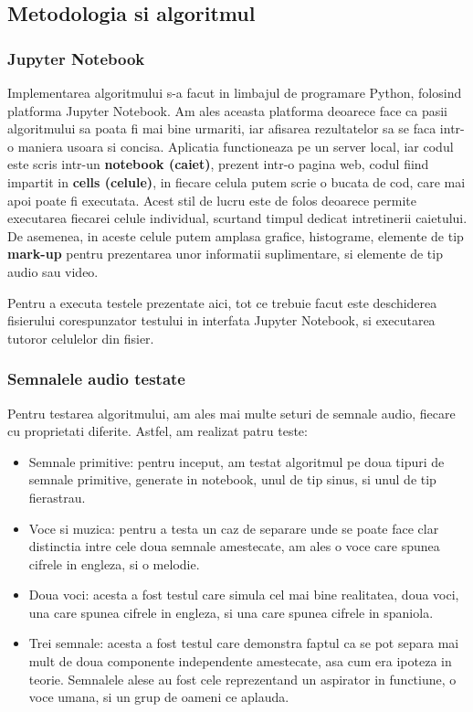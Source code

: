 \documentclass[12pt,oneside]{article}
\begin{document}
\subsection{Metodologia si algoritmul}
\subsubsection{Jupyter Notebook}
Implementarea algoritmului s-a facut in limbajul de programare Python, folosind platforma Jupyter Notebook. Am ales aceasta platforma deoarece face ca pasii algoritmului sa poata fi mai bine urmariti, iar afisarea rezultatelor sa se faca intr-o maniera usoara si concisa. Aplicatia functioneaza pe un server local, iar codul este scris intr-un \textbf{notebook (caiet)}, prezent intr-o pagina web, codul fiind impartit in \textbf{cells (celule)}, in fiecare celula putem scrie o bucata de cod, care mai apoi poate fi executata. Acest stil de lucru este de folos deoarece permite executarea fiecarei celule individual, scurtand timpul dedicat intretinerii caietului. De asemenea, in aceste celule putem amplasa grafice, histograme, elemente de tip \textbf{mark-up} pentru prezentarea unor informatii suplimentare, si elemente de tip audio sau video. 

Pentru a executa testele prezentate aici, tot ce trebuie facut este deschiderea fisierului corespunzator testului in interfata Jupyter Notebook, si executarea tutoror celulelor din fisier.

\subsubsection{Semnalele audio testate}
Pentru testarea algoritmului, am ales mai multe seturi de semnale audio, fiecare cu proprietati diferite. Astfel, am realizat patru teste:
\begin{itemize}
	\item{Semnale primitive: pentru inceput, am testat algoritmul pe doua tipuri de semnale primitive, generate in notebook, unul de tip sinus, si unul de tip fierastrau.\cite{scikit_ica_pca}}
	\item{Voce si muzica: pentru a testa un caz de separare unde se poate face clar distinctia intre cele doua semnale amestecate, am ales o voce care spunea cifrele in engleza, si o melodie.\cite{sound_samples_1}
} 	\item{Doua voci: acesta a fost testul care simula cel mai bine realitatea, doua voci, una care spunea cifrele in engleza, si una care spunea cifrele in spaniola.\cite{sound_samples_1}} 
	\item{Trei semnale: acesta a fost testul care demonstra faptul ca se pot separa mai mult de doua componente independente amestecate, asa cum era ipoteza in teorie. Semnalele alese au fost cele reprezentand un aspirator in functiune, o voce umana, si un grup de oameni ce aplauda.\cite{vsubhashini}}
\end{itemize}
\end{document}
